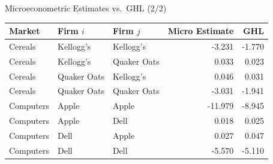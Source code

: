 \documentclass[
  10pt,
  aspectratio=169,   %
]{beamer}
\theoremstyle{plain}
\begin{document}
\begin{frame}[t]{Microeconometric Estimates vs.\ GHL \citep{Pellegrino2024-dn}  (2/2)}
  \begin{center}
    \begin{tabular}{lllrr}
      \toprule
      Market    & Firm $i$    & Firm $j$    & Micro Estimate & GHL    \\
      \midrule
      Cereals   & Kellogg's   & Kellogg's   & -3.231         & -1.770 \\
      Cereals   & Kellogg's   & Quaker Oats & 0.033          & 0.023  \\
      Cereals   & Quaker Oats & Kellogg's   & 0.046          & 0.031  \\
      Cereals   & Quaker Oats & Quaker Oats & -3.031         & -1.941 \\
      \addlinespace
      Computers & Apple       & Apple       & -11.979        & -8.945 \\
      Computers & Apple       & Dell        & 0.018          & 0.025  \\
      Computers & Dell        & Apple       & 0.027          & 0.047  \\
      Computers & Dell        & Dell        & -5.570         & -5.110 \\
      \bottomrule
    \end{tabular}
  \end{center}
  \hyperlink{product_identification}{}
\end{frame}
\end{document}
